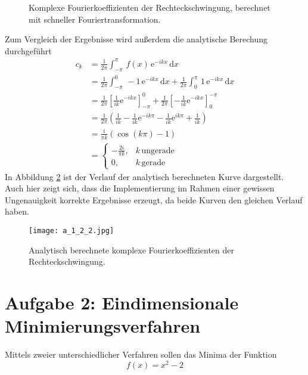 \begin{itemize}[leftmargin=*]
\begin{figure}[H]
							\caption{Komplexe Fourierkoeffizienten der Rechteckschwingung, berechnet mit schneller Fouriertransformation.}
							\label{fig:fig2}
					\end{figure}
					\FloatBarrier
					\noindent
					Zum Vergleich der Ergebnisse wird außerdem die analytische Berechung durchgeführt
					\begin{align*}
						c_k &= \frac{1}{2 \pi} \int_{-\pi}^{\pi} \, f(x) \, \text{e}^{-ikx} \, \text{d}x \\
								&= \frac{1}{2 \pi} \int_{-\pi}^{0} \, -1 \, \text{e}^{-ikx} \, \text{d}x + \frac{1}{2 \pi} \int_{0}^{\pi} \, 1 \, \text{e}^{-ikx} \, \text{d}x \\
								&= \frac{1}{2 \pi}\left[\frac{1}{ik}  \text{e}^{-ikx}\right]_{-\pi}^0 + \frac{1}{2 \pi}\left[-\frac{1}{ik}  \text{e}^{-ikx}\right]_{0}^{-\pi} \\
								&= \frac{1}{2 \pi} \left(\frac{1}{ik}-\frac{1}{ik}\text{e}^{-ik\pi}-\frac{1}{ik}\text{e}^{ik\pi}+\frac{1}{ik}\right) \\
								&= \frac{i}{\pi k} \left(\cos(k\pi)-1\right) \\
								&= \begin{cases}
									-\frac{2i}{\pi k}, & k \, \text{ungerade} \\
									0,  & k \, \text{gerade} \,
							\end{cases}
					\end{align*}
					In Abbildung \ref{fig:fig3} ist der Verlauf der analytisch berechneten Kurve dargestellt. Auch hier zeigt sich, dass die Implementierung im Rahmen einer gewissen Ungenauigkeit korrekte Ergebnisse erzeugt, da beide Kurven den
					gleichen Verlauf haben.
					\FloatBarrier
					\begin{figure}[H]
							\centering
							\texttt{[image: a\_1\_2\_2.jpg]}
							\caption{Analytisch berechnete komplexe Fourierkoeffizienten der Rechteckschwingung.}
							\label{fig:fig3}
					\end{figure}
					\FloatBarrier
					\noindent
\end{itemize}

\section*{Aufgabe 2: Eindimensionale Minimierungsverfahren}

Mittels zweier unterschiedlicher Verfahren sollen das Minima der Funktion
\begin{equation*}
  f(x) = x^2 - 2
\end{equation*}

